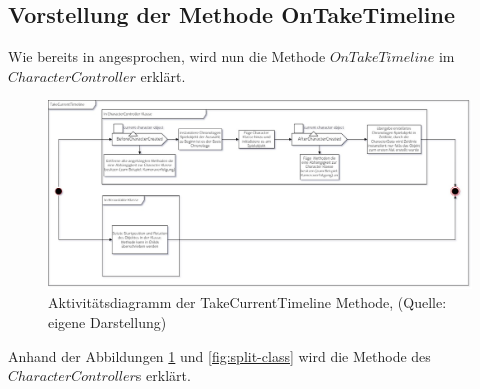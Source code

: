 \subsection{Vorstellung der Methode OnTakeTimeline}\label{sec:take_current_timeline_prototype}
Wie bereits in  angesprochen, wird nun die Methode $OnTakeTimeline$ im $CharacterController$ erklärt.

\begin{figure}[ht]
\centering
\includegraphics[width=1\linewidth]{content/pictures/OnTakeCurrentTimeline_uml.jpg}
\caption{Aktivitätsdiagramm der TakeCurrentTimeline Methode, (Quelle: eigene Darstellung)}
\label{fig:take_current_timeline-uml}
\end{figure}

Anhand der Abbildungen \ref{fig:take_current_timeline-uml} und \ref{fig:split-class} wird die Methode des \\$CharacterController$s erklärt.

